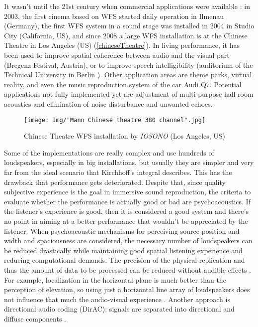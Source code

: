 It wasn't until the 21st century when commercial applications were available \cite{Brandenburg2009}: in 2003, the first cinema based on WFS started daily operation in Ilmenau (Germany), the first WFS system in a sound stage was installed in 2004 in Studio City (California, US), and since 2008 a large WFS installation is at the Chinese Theatre in Los Angeles (US) (\autoref{chineseTheatre}). In living performance, it has been used to improve spatial coherence between audio and the visual part (Bregenz Festival, Austria), or to improve speech intelligibility (auditorium of the Technical University in Berlin \cite{Musicology}). Other application areas are theme parks, virtual reality, and even the music reproduction system of the car Audi Q7. Potential applications not fully implemented yet are adjustment of multi-purpose hall room acoustics and elimination of noise disturbance and unwanted echoes.

\begin{figure}[h]
	\centering
	\texttt{[image: Img/"Mann Chinese theatre 380 channel".jpg]}
	\caption{Chinese Theatre WFS installation by \emph{IOSONO} (Los Angeles, US)}
	\label{chineseTheatre}
\end{figure}

Some of the implementations are really complex and use hundreds of loudspeakers, especially in big installations, but usually they are simpler and very far from the ideal scenario that Kirchhoff's integral describes. This has the drawback that performance gets deteriorated. Despite that, since quality subjective experience is the goal in immersive sound reproduction, the criteria to evaluate whether the performance is actually good or bad are psychoacoustics. If the listener's experience is good, then it is considered a good system and there's no point in aiming at a better performance that wouldn't be appreciated by the listener.
When psychoacoustic mechanisms for perceiving source position and width and spaciousness are considered, the necessary number of loudspeakers can be reduced drastically while maintaining good spatial listening experience and reducing computational demands. The precision of the physical replication and thus the amount of data to be processed can be reduced without audible effects \cite{Musicology}. For example, localization in the horizontal plane is much better than the perception of elevation, so using just a horizontal line array of loudspeakers does not influence that much the audio-visual experience \cite{Brandenburg2009}. Another approach is directional audio coding (DirAC): signals are separated into directional and diffuse components \cite{Musicology}.


